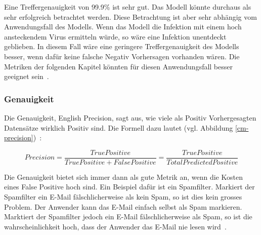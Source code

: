Eine Treffergenauigkeit von 99.9\% ist sehr gut. Das Modell könnte durchaus als sehr erfolgreich betrachtet werden. Diese Betrachtung ist aber sehr abhängig vom Anwendungsfall des Modells. Wenn das Modell die Infektion mit einem hoch ansteckendem Virus ermitteln würde, so wäre eine Infektion unentdeckt geblieben. In diesem Fall wäre eine geringere Treffergenauigkeit des Modells besser, wenn dafür keine falsche Negativ Vorhersagen vorhanden wären. Die Metriken der folgenden Kapitel könnten für diesen Anwendungsfall besser geeignet sein~\autocite{TDSAccuracy}.

\subsubsection{Genauigkeit}

Die Genauigkeit, English Precision, sagt aus, wie viele als Positiv Vorhergesagten Datensätze wirklich Positiv sind. Die Formell dazu lautet (vgl. Abbildung \ref{cm-precision})~\autocite{TDSAccuracy}: 

$$Precision = \frac{True Positive}{True Positive + False Positive} = \frac{True Positive}{Total Predicted Positive}$$

Die Genauigkeit bietet sich immer dann als gute Metrik an, wenn die Kosten eines False Positive hoch sind. Ein Beispiel dafür ist ein Spamfilter. Markiert der Spamfilter ein E-Mail fälschlicherweise als kein Spam, so ist dies kein grosses Problem. Der Anwender kann das E-Mail einfach selbst als Spam markieren. Marktiert der Spamfilter jedoch ein E-Mail fälschlicherweise als Spam, so ist die wahrscheinlichkeit hoch, dass der Anwender das E-Mail nie lesen wird~\autocite{TDSAccuracy}.


